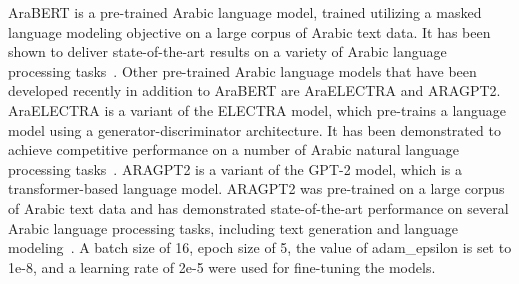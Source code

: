 \documentclass[sn-mathphys,Numbered]{sn-jnl}%
\begin{document}



AraBERT is a pre-trained Arabic language model, trained utilizing a masked language modeling objective on a large corpus of Arabic text data. It has been shown to deliver state-of-the-art results on a variety of Arabic language processing tasks~\cite{antoun2020arabert}. Other pre-trained Arabic language models that have been developed recently in addition to AraBERT are AraELECTRA and ARAGPT2. AraELECTRA is a variant of the ELECTRA model, which pre-trains a language model using a generator-discriminator architecture. It has been demonstrated to achieve competitive performance on a number of Arabic natural language processing tasks~\cite{antoun-etal-2021-araelectra}. ARAGPT2 is a variant of the GPT-2 model, which is a transformer-based language model. ARAGPT2 was pre-trained on a large corpus of Arabic text data and has demonstrated state-of-the-art performance on several Arabic language processing tasks, including text generation and language modeling~\cite{antoun-etal-2021-aragpt2}. A batch size of 16, epoch size of 5, the value of adam\_epsilon is set to 1e-8, and a learning rate of 2e-5 were used for fine-tuning the models.


\end{document}
